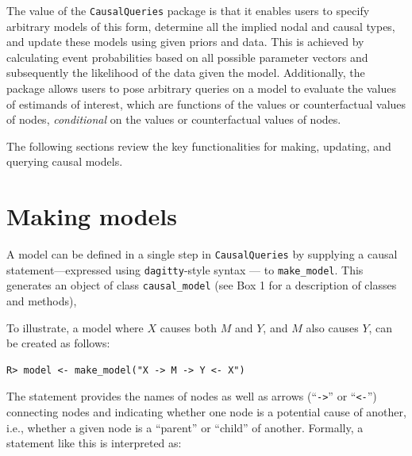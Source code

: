 \documentclass[
  11pt,
  article]{jss}
\begin{document}
The value of the \texttt{CausalQueries} package is that it enables users
to specify arbitrary models of this form, determine all the implied
nodal and causal types, and update these models using given priors and
data. This is achieved by calculating event probabilities based on all
possible parameter vectors and subsequently the likelihood of the data
given the model. Additionally, the package allows users to pose
arbitrary queries on a model to evaluate the values of estimands of
interest, which are functions of the values or counterfactual values of
nodes, \emph{conditional} on the values or counterfactual values of
nodes.

The following sections review the key functionalities for making,
updating, and querying causal models.

\section{Making models}\label{sec-make}

A model can be defined in a single step in \texttt{CausalQueries} by
supplying a causal statement---expressed using \texttt{dagitty}-style
syntax \citep{textor_robust_2016}--- to \texttt{make\_model}. This
generates an object of class \texttt{causal\_model} (see Box 1 for a
description of classes and methods),

To illustrate, a model where \(X\) causes both \(M\) and \(Y\), and
\(M\) also causes \(Y\), can be created as follows:

\begin{verbatim}
R> model <- make_model("X -> M -> Y <- X")
\end{verbatim}

The statement provides the names of nodes as well as arrows
(``\texttt{-\textgreater{}}'' or ``\texttt{\textless{}-}'') connecting
nodes and indicating whether one node is a potential cause of another,
i.e., whether a given node is a ``parent'' or ``child'' of another.
Formally, a statement like this is interpreted as:
\end{document}
